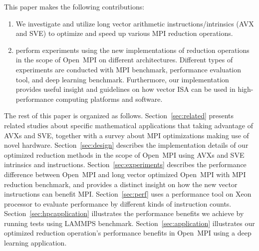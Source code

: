 \documentclass[5p,times,twocolumn]{elsarticle}
\newcommand{\ompi}[0]{Open~MPI\xspace}
\newcommand{\mpi}[0]{\textsc{MPI}\xspace}
\newcommand{\sve}[0]{\textsc{SVE}\xspace}
\begin{document}
This paper makes the following contributions:
\begin{enumerate}
  \item We investigate and utilize long vector arithmetic instructions/intrinsics (AVX and SVE) to optimize and
  speed up various \mpi reduction operations.
%
  \item perform experiments using the new implementations of reduction operations in the scope
  of \ompi on different architectures. Different types of
  experiments are conducted with \mpi benchmark, performance evaluation tool, and
  deep learning benchmark.
  Furthermore, our implementation provides useful insight and guidelines on how vector
  ISA can be used in high-performance computing platforms and software.
\end{enumerate}

The rest of this paper is organized as follows.
Section~\ref{sec:related} presents related studies about specific mathematical
applications that taking advantage of AVXs and \sve,
together with a survey about \mpi optimizations making use of novel hardware.
Section~\ref{sec:design} describes the implementation details of our optimized reduction methods
in the scope of \ompi using AVXs and SVE intrinsics and instructions.
Section~\ref{sec:experiments} describes the performance difference between
\ompi and long vector optimized \ompi with MPI reduction benchmark, and provides a distinct insight on how the
new vector instructions can benefit \mpi.
Section~\ref{sec:perf} uses a performance tool on Xeon processor to evaluate performance by different kinds of instruction counts.
Section~\ref{sec:hpcapplication} illustrates the performance benefits we achieve by running tests using LAMMPS benchmark.
Section~\ref{sec:application} illustrates our optimized reduction operation's performance
benefits in \ompi using a deep learning application.
\end{document}
